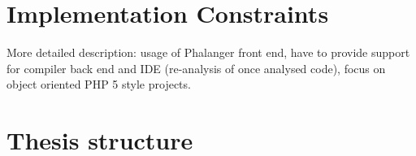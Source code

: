     \section{Implementation Constraints}
    More detailed description: usage of Phalanger front end, have to 
    provide support for compiler back end and IDE (re-analysis of once analysed code), 
    focus on object oriented PHP 5 style projects.
    
    
    \section{Thesis structure}